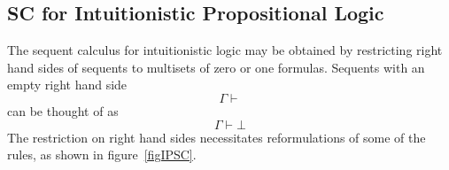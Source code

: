 \subsection{SC for Intuitionistic Propositional Logic}
The sequent calculus for intuitionistic logic may be obtained by restricting
right hand sides of  sequents to multisets of zero or one formulas.  Sequents
with an empty right hand side
\[\Gamma\vdash\]
can be thought of as
\[\Gamma\vdash\bot\]
The restriction on right hand sides necessitates 
reformulations of some of the rules, as shown in figure~\ref{figIPSC}.
\begin{figure}
\begin{center}
\end{center}
\end{figure}

